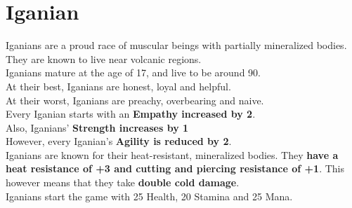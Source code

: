 \section{Iganian}\label{race:iganian}
Iganians are a proud race of muscular beings with partially mineralized bodies.
They are known to live near volcanic regions.\\
Iganians mature at the age of 17, and live to be around 90.\\
At their best, Iganians are honest, loyal and helpful.\\
At their worst, Iganians are preachy, overbearing and naive.\\
Every Iganian starts with an \textbf{Empathy increased by 2}.\\
Also, Iganians' \textbf{Strength increases by 1}\\
However, every Iganian's \textbf{Agility is reduced by 2}.\\
Iganians are known for their heat-resistant, mineralized bodies.
They \textbf{have a heat resistance of +3 and cutting and piercing resistance of +1}.
This however means that they take \textbf{double cold damage}.\\
Iganians start the game with 25 Health, 20 Stamina and 25 Mana.